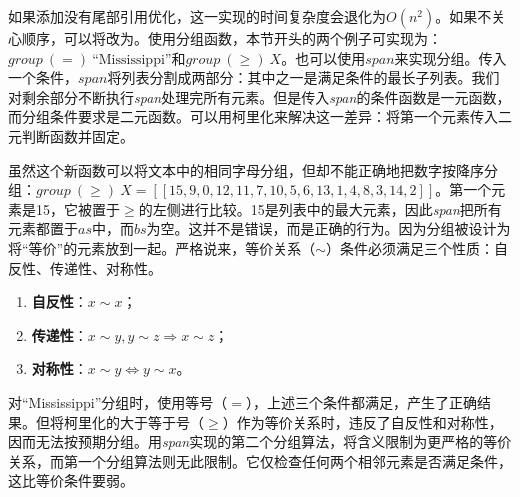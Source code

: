\documentclass[b5paper]{ctexart}
\begin{document}
如果添加没有尾部引用优化，这一实现的时间复杂度会退化为$O(n^2)$。如果不关心顺序，可以将改为。使用分组函数，本节开头的两个例子可实现为：$\textit{group}\ (=)\ \text{``Mississippi''}$和$\textit{group}\ (\geq)\ X$。也可以使用$span$来实现分组。传入一个条件，$span$将列表分割成两部分：其中之一是满足条件的最长子列表。我们对剩余部分不断执行\textit{span}处理完所有元素。但是传入\textit{span}的条件函数是一元函数，而分组条件要求是二元函数。可以用柯里化来解决这一差异：将第一个元素传入二元判断函数并固定。

\be
{}
\ee

虽然这个新函数可以将文本中的相同字母分组，但却不能正确地把数字按降序分组：$\textit{group}\ (\geq)\ X = [[15,9,0,12,11,7,10,5,6,13,1,4,8,3,14,2]]$。第一个元素是15，它被置于$\geq$的左侧进行比较。15是列表中的最大元素，因此\textit{span}把所有元素都置于$as$中，而$bs$为空。这并不是错误，而是正确的行为。因为分组被设计为将“等价”的元素放到一起。严格说来，等价关系（$\sim$）条件必须满足三个性质：自反性、传递性、对称性。

\begin{enumerate}
\item \textbf{自反性}：$x \sim x$；
\item \textbf{传递性}：$x \sim y, y \sim z \Rightarrow x \sim z$；
\item \textbf{对称性}：$x \sim y \Leftrightarrow y \sim x$。
\end{enumerate}

对``Mississippi''分组时，使用等号（$=$），上述三个条件都满足，产生了正确结果。但将柯里化的大于等于号（$\geq$）作为等价关系时，违反了自反性和对称性，因而无法按预期分组。用\textit{span}实现的第二个分组算法，将含义限制为更严格的等价关系，而第一个分组算法则无此限制。它仅检查任何两个相邻元素是否满足条件，这比等价条件要弱。

\begin{Exercise}
\end{Exercise}
\end{document}
